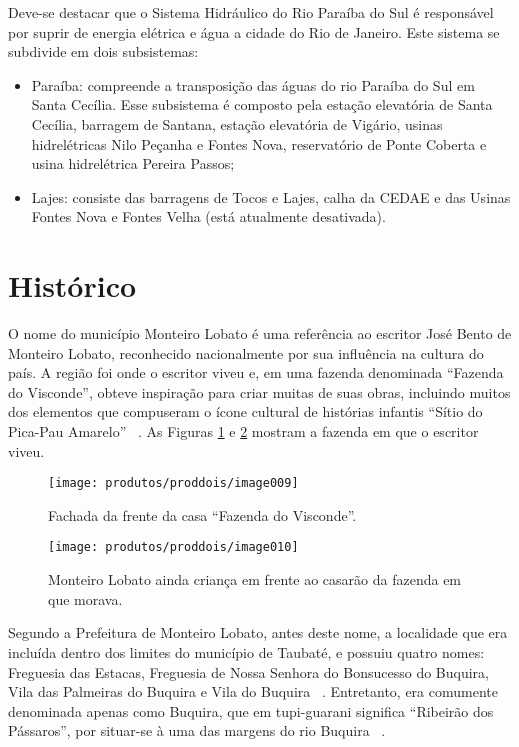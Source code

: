 Deve-se destacar que o Sistema Hidráulico do Rio Paraíba do Sul é responsável por suprir de energia elétrica e água a cidade do Rio de Janeiro. Este sistema se subdivide em dois subsistemas:

\begin{itemize}
	\item Paraíba: compreende a transposição das águas do rio Paraíba do Sul em Santa Cecília. Esse subsistema é composto pela estação elevatória de Santa Cecília, barragem de Santana, estação elevatória de Vigário, usinas hidrelétricas Nilo Peçanha e Fontes Nova, reservatório de Ponte Coberta e usina hidrelétrica Pereira Passos;
	\item Lajes: consiste das barragens de Tocos e Lajes, calha da CEDAE e das Usinas Fontes Nova e Fontes Velha (está atualmente desativada).
\end{itemize}
\section{Histórico}

O nome do município Monteiro Lobato é uma referência ao escritor José Bento de Monteiro Lobato, reconhecido nacionalmente por sua influência na cultura do país. A região foi onde o escritor viveu e, em uma fazenda denominada “Fazenda do Visconde”, obteve inspiração para criar muitas de suas obras, incluindo muitos dos elementos que compuseram o ícone cultural de histórias infantis “Sítio do Pica-Pau Amarelo” ~\cite{squeff2003origem,IBGE2010}. As Figuras \ref{fig:image009} e \ref{fig:image010} mostram a fazenda em que o escritor viveu. 
 
\begin{figure}[h!]
	\centering
	\texttt{[image: produtos/proddois/image009]}
	\caption{Fachada da frente da casa “Fazenda do Visconde”.}
	\label{fig:image009}
\end{figure}

\begin{figure}[h!]
	\centering
	\texttt{[image: produtos/proddois/image010]}
	\caption{Monteiro Lobato ainda criança em frente ao casarão da fazenda em que morava.}
	\label{fig:image010}
\end{figure}

Segundo a Prefeitura de Monteiro Lobato, antes deste nome, a localidade que era incluída dentro dos limites do município de Taubaté, e possuiu quatro nomes: Freguesia das Estacas, Freguesia de Nossa Senhora do Bonsucesso do Buquira, Vila das Palmeiras do Buquira e Vila do Buquira ~\cite{MonteiroLobatoSite}. Entretanto, era comumente denominada apenas como Buquira, que em tupi-guarani significa “Ribeirão dos Pássaros”, por situar-se à uma das margens do rio Buquira ~\cite{IBGE2010}.

